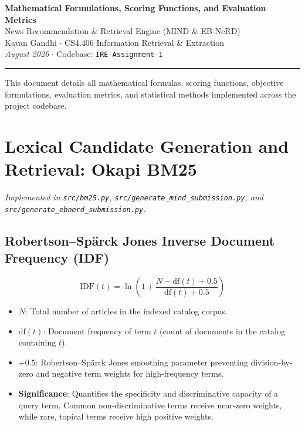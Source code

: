 \documentclass[11pt,a4paper]{article}
\begin{document}
\begin{center}
  {\Large\bfseries Mathematical Formulations, Scoring Functions, and Evaluation Metrics}\\[4pt]
  {\large News Recommendation \& Retrieval Engine (MIND \& EB-NeRD)}\\[6pt]
  {\normalsize Kavan Gandhi \quad $\cdot$ \quad CS4.406 Information Retrieval \& Extraction}\\[2pt]
  {\small \textit{August 2026} \quad $\cdot$ \quad Codebase: \texttt{IRE-Assignment-1}}
\end{center}
\vspace{-2pt}\hrule\vspace{8pt}

This document details all mathematical formulas, scoring functions, objective formulations, evaluation metrics, and statistical methods implemented across the project codebase.

\section{Lexical Candidate Generation and Retrieval: Okapi BM25}
\textit{Implemented in \texttt{src/bm25.py}, \texttt{src/generate\_mind\_submission.py}, and \texttt{src/generate\_ebnerd\_submission.py}.}

\subsection{Robertson--Sp\"arck Jones Inverse Document Frequency (IDF)}
\begin{equation}
\text{IDF}(t) = \ln\left(1 + \frac{N - \text{df}(t) + 0.5}{\text{df}(t) + 0.5}\right)
\end{equation}

\begin{itemize}
  \item $N$: Total number of articles in the indexed catalog corpus.
  \item $\text{df}(t)$: Document frequency of term $t$ (count of documents in the catalog containing $t$).
  \item $+0.5$: Robertson--Sp\"arck Jones smoothing parameter preventing division-by-zero and negative term weights for high-frequency terms.
  \item \textbf{Significance}: Quantifies the specificity and discriminative capacity of a query term. Common non-discriminative terms receive near-zero weights, while rare, topical terms receive high positive weights.
\end{itemize}
\end{document}
